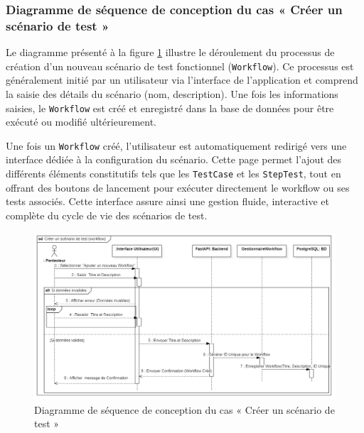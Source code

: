 \subsubsection{Diagramme de séquence de conception du cas « Créer un scénario de test »}
Le diagramme présenté à la figure \ref{fig:add-workflow} illustre le déroulement du processus de création d’un nouveau scénario de test fonctionnel (\texttt{Workflow}). Ce processus est généralement initié par un utilisateur via l’interface de l’application et comprend la saisie des détails du scénario (nom, description). Une fois les informations saisies, le \texttt{Workflow} est créé et enregistré dans la base de données pour être exécuté ou modifié ultérieurement.

Une fois un \texttt{Workflow} créé, l'utilisateur est automatiquement redirigé vers une interface dédiée à la configuration du scénario. Cette page permet l’ajout des différents éléments constitutifs tels que les \texttt{TestCase} et les \texttt{StepTest}, tout en offrant des boutons de lancement pour exécuter directement le workflow ou ses tests associés. Cette interface assure ainsi une gestion fluide, interactive et complète du cycle de vie des scénarios de test.

\begin{figure}[H]
    \centering
    \includegraphics[width=\linewidth]{chapitres/ch4Sp2/section/sprint2.1/img/seq-workflow-creer.png}
    \caption{Diagramme de séquence de conception du cas « Créer un scénario de test »}
    \label{fig:add-workflow}
\end{figure}
\vspace{-0.4cm}

    